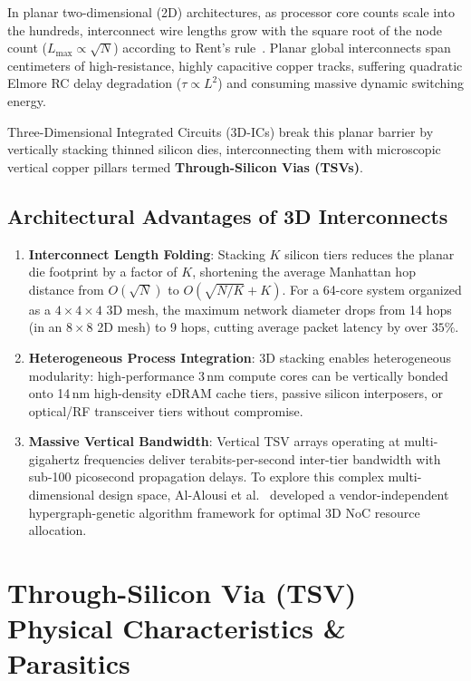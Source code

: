 In planar two-dimensional (2D) architectures, as processor core counts scale into the hundreds, interconnect wire lengths grow with the square root of the node count ($L_{\mathrm{max}} \propto \sqrt{N}$) according to Rent's rule~\cite{Pavlidis2009}. Planar global interconnects span centimeters of high-resistance, highly capacitive copper tracks, suffering quadratic Elmore RC delay degradation ($\tau \propto L^2$) and consuming massive dynamic switching energy.

Three-Dimensional Integrated Circuits (3D-ICs) break this planar barrier by vertically stacking thinned silicon dies, interconnecting them with microscopic vertical copper pillars termed \textbf{Through-Silicon Vias (TSVs)}.

\subsection{Architectural Advantages of 3D Interconnects}

\begin{enumerate}
    \item \textbf{Interconnect Length Folding}: Stacking $K$ silicon tiers reduces the planar die footprint by a factor of $K$, shortening the average Manhattan hop distance from $O(\sqrt{N})$ to $O(\sqrt{N/K} + K)$. For a 64-core system organized as a $4 \times 4 \times 4$ 3D mesh, the maximum network diameter drops from 14 hops (in an $8 \times 8$ 2D mesh) to 9 hops, cutting average packet latency by over $35\%$.
    
    \item \textbf{Heterogeneous Process Integration}: 3D stacking enables heterogeneous modularity: high-performance 3\,nm compute cores can be vertically bonded onto 14\,nm high-density eDRAM cache tiers, passive silicon interposers, or optical/RF transceiver tiers without compromise.
    
    \item \textbf{Massive Vertical Bandwidth}: Vertical TSV arrays operating at multi-gigahertz frequencies deliver terabits-per-second inter-tier bandwidth with sub-100 picosecond propagation delays. To explore this complex multi-dimensional design space, Al-Alousi et al.~\cite{AlAlousi2026} developed a vendor-independent hypergraph-genetic algorithm framework for optimal 3D NoC resource allocation.
\end{enumerate}

\section{Through-Silicon Via (TSV) Physical Characteristics \& Parasitics}
\label{sec:tsv-physics}

